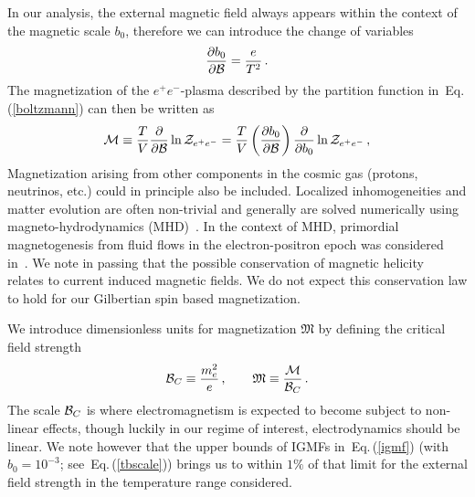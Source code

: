 \documentclass[aps,prd,floatfix,reprint]{revtex4-2}
\newcommand{\req}[1]{Eq.\,(\ref{#1})}
\newcommand*{\xblue}{\color{black}}
\begin{document}
In our analysis, the external magnetic field always appears within the context of the magnetic scale $b_{0}$, therefore we can introduce the change of variables
\begin{align}
 \frac{\partial b_{0}}{\partial{\cal B}}=\frac{e}{T^{2}}\,.
\end{align}
The magnetization of the $e^{+}e^{-}$-plasma described by the partition function in~\req{boltzmann} can then be written as
\begin{align}
\label{defmagetization}
 {\cal M}\equiv\frac{T}{V}\frac{\partial}{\partial{\cal B}}\ln{{\cal Z}_{e^{+}e^{-}}} = \frac{T}{V}\left(\frac{\partial b_{0}}{\partial{\cal B}}\right)\frac{\partial}{\partial b_{0}}\ln{{\cal Z}_{e^{+}e^{-}}}\,,
\end{align}
Magnetization arising from other components in the cosmic gas (protons, neutrinos, etc.) could in principle also be included. Localized inhomogeneities and matter evolution are often non-trivial and generally are solved numerically using magneto-hydrodynamics (MHD)~\cite{melrose2008quantum,Vazza:2017qge,Vachaspati:2020blt,Stoneking:2020egj}. In the context of MHD, primordial magnetogenesis from fluid flows in the electron-positron epoch was considered in~\cite{Gopal:2004ut,Perrone:2021srr}. {\xblue We note in passing that the possible conservation of magnetic helicity~\cite{Boyarsky:2011uy}
relates to current induced magnetic fields. We do not expect this conservation law to hold for our Gilbertian spin based magnetization. 
}

We introduce dimensionless units for magnetization ${\mathfrak M}$ by defining the critical field strength
\begin{align}
 {\cal B}_{C}\equiv\frac{m_{e}^{2}}{e}\,,\qquad{\mathfrak M}\equiv\frac{\cal M}{{\cal B}_{C}}\,.
\end{align}
The scale ${\cal B}_{C}$ is where electromagnetism is expected to become subject to non-linear effects, though luckily in our regime of interest, electrodynamics should be linear. We note however that the upper bounds of IGMFs in~\req{igmf} (with $b_{0}=10^{-3}$; see~\req{tbscale}) brings us to within $1\%$ of that limit for the external field strength in the temperature range considered.
\end{document}
